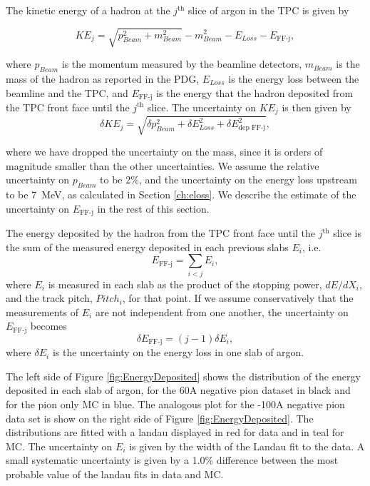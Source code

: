 The kinetic energy of a hadron at the $j^{\text{th}}$ slice of argon in the TPC is given by

\begin{equation}
KE_{j} = \sqrt{p_{Beam}^2 + m_{Beam}^2} - m_{Beam}^2 - E_{Loss} - E_{\text{FF-j}},
\end{equation}

where $p_{Beam}$ is the momentum measured by the beamline detectors,  $m_{Beam}$ is the mass of the hadron as reported in the PDG,  $E_{Loss}$  is the energy loss between the beamline and the TPC, and $ E_{\text{FF-j}}$ is the energy that the hadron deposited from the TPC front face until the $j^{\text{th}}$ slice.
The uncertainty on $KE_{j}$ is then given by 
\begin{equation}
\delta KE_{j} = \sqrt{\delta p_{Beam}^2 + \delta E_{Loss}^2 +  \delta  E_{\text{dep FF-j}}^2},
\end{equation}

where we have dropped the uncertainty on the mass, since it is orders of magnitude smaller than the other uncertainties.
We assume the relative uncertainty on $p_{Beam}$ to be 2\%, and the uncertainty on the energy loss upstream to be 7~MeV, as calculated in Section \ref{ch:eloss}. We describe the estimate of the uncertainty on $E_{\text{FF-j}}$ in the rest of this section.

The energy deposited by the hadron from the TPC front face until the $j^{\text{th}}$ slice is the sum of the measured energy deposited in each previous slabs $E_{i}$, i.e.
\begin{equation}
E_{\text{FF-j}} = \sum_{i<j} E_{i}, 
\end{equation}
where $E_{i}$ is measured in each slab as  the product of the stopping power,  $dE/dX_{i}$,  and the track pitch, $Pitch_i$, for that point. 
If we assume conservatively that the measurements of $E_{i}$ are not independent from one another, the uncertainty on $E_{\text{FF-j}}$ becomes
\begin{equation}
\delta E_{\text{FF-j}} = (j-1) \delta E_{i}, 
\end{equation}
where $\delta E_{i}$ is the uncertainty on the energy loss in one slab of argon.

The left side of Figure \ref{fig:EnergyDeposited} shows the distribution of the energy deposited in each slab of argon, for the 60A negative pion dataset in black and for the pion only MC in blue. The analogous plot for the -100A negative pion data set  is show on the right side of Figure \ref{fig:EnergyDeposited}.  The distributions are fitted with a landau displayed in red for data and in teal for MC.
The uncertainty on $E_{i}$ is given by the width of the Landau fit to the data. A small systematic uncertainty  is given by a 1.0\% difference between the most probable value of the landau fits in data and MC.

